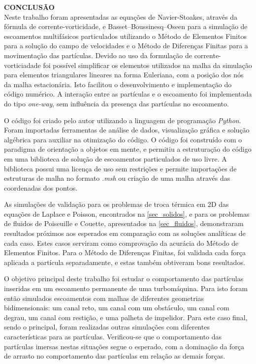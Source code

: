\noindent\textbf{CONCLUSÃO}
\\

Neste trabalho foram apresentadas as equações de Navier-Stoakes, através da fórmula de corrente-vorticidade, e Basset–Boussinesq–Oseen para a simulação de escoamentos multifásicos particulados utilizando o Método de Elementos Finitos para a solução do campo de velocidades e o Método de Diferenças Finitas para a movimentação das partículas.
Devido ao uso da formulação de corrente-vorticiadade foi possível simplificar os elementos utilizados na malha da simulação para elementos triangulares lineares na forma Euleriana, com a posição dos nós da malha estacionária.
Isto facilitou o desenvolvimento e implementação do código numérico.
A interação entre as partículas e o escoamento foi implementada do tipo \textit{one-way}, sem influência da presença das partículas no escoamento.

O código foi criado pelo autor utilizando a linguagem de programação \textit{Python}.
Foram importadas ferramentas de análise de dados, visualização gráfica e solução algébrica para auxiliar na otimização do código.
O código foi construído com o paradigma de orientação a objetos em mente, e permitiu a estruturação do código em uma biblioteca de solução de escoamentos particulados de uso livre.
A biblioteca possui uma licença de uso sem restrições e permite importações de estruturas de malha no formato \textit{.msh} ou criação de uma malha através das coordenadas dos pontos.

As simulações de validação para os problemas de troca térmica em 2D das equações de Laplace e Poisson, encontrados na \ref{sec_solidos}, e para os problemas de fluidos de Poiseuille e Couette, apresentados na \ref{sec_fluidos}, demonstraram resultados próximos aos esperados em comparação com as soluções analíticas de cada caso.
Estes casos serviram como comprovação da acurácia do Método de Elementos Finitos.
Para o Método de Diferenças Finitas, foi validada cada força aplicada a partícula separadamente, e estas também obtiveram bons resultados.

O objetivo principal deste trabalho foi estudar o comportamento das partículas inseridas em um escoamento permanente de uma turbomáquina.
Para isto foram então simulados escoamentos com malhas de diferentes geometrias bidimensionais: um canal reto, um canal com um obstáculo, um canal com degrau, um canal com restição, e uma palheta de impelidor.
Para este caso final, sendo o principal, foram realizadas outras simulações com diferentes características para as partículas.
Verificou-se que o comportamento das partículas imersas nestas situações segue o esperado, com a dominação da força de arrasto no comportamento das partículas em relação as demais forças.

